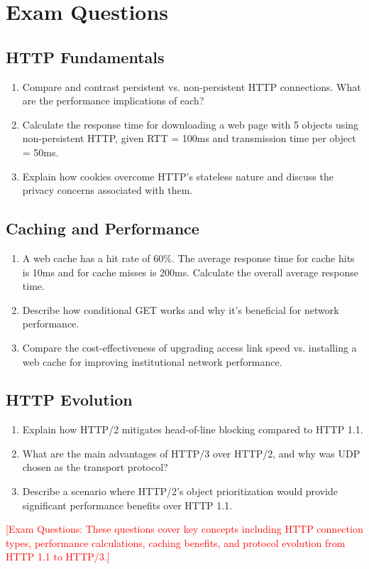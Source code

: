 \documentclass[12pt]{article}
\begin{document}
\section*{Exam Questions}

\subsection*{HTTP Fundamentals}
\begin{enumerate}
    \item Compare and contrast persistent vs. non-persistent HTTP connections. What are the performance implications of each?
    \item Calculate the response time for downloading a web page with 5 objects using non-persistent HTTP, given RTT = 100ms and transmission time per object = 50ms.
    \item Explain how cookies overcome HTTP's stateless nature and discuss the privacy concerns associated with them.
\end{enumerate}

\subsection*{Caching and Performance}
\begin{enumerate}
    \item A web cache has a hit rate of 60\%. The average response time for cache hits is 10ms and for cache misses is 200ms. Calculate the overall average response time.
    \item Describe how conditional GET works and why it's beneficial for network performance.
    \item Compare the cost-effectiveness of upgrading access link speed vs. installing a web cache for improving institutional network performance.
\end{enumerate}

\subsection*{HTTP Evolution}
\begin{enumerate}
    \item Explain how HTTP/2 mitigates head-of-line blocking compared to HTTP 1.1.
    \item What are the main advantages of HTTP/3 over HTTP/2, and why was UDP chosen as the transport protocol?
    \item Describe a scenario where HTTP/2's object prioritization would provide significant performance benefits over HTTP 1.1.
\end{enumerate}

\textcolor{red}{[Exam Questions: These questions cover key concepts including HTTP connection types, performance calculations, caching benefits, and protocol evolution from HTTP 1.1 to HTTP/3.]}
\end{document}
